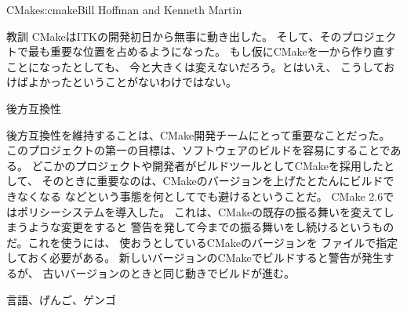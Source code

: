 \begin{aosachapter}{CMake}{s:cmake}{Bill Hoffman and Kenneth Martin}
\begin{aosasect1}{教訓}
CMakeはITKの開発初日から無事に動き出した。
そして、そのプロジェクトで最も重要な位置を占めるようになった。
もし仮にCMakeを一から作り直すことになったとしても、
今と大きくは変えないだろう。とはいえ、
こうしておけばよかったということがないわけではない。

\begin{aosasect2}{後方互換性}

後方互換性を維持することは、CMake開発チームにとって重要なことだった。
このプロジェクトの第一の目標は、ソフトウェアのビルドを容易にすることである。
どこかのプロジェクトや開発者がビルドツールとしてCMakeを採用したとして、
そのときに重要なのは、CMakeのバージョンを上げたとたんにビルドできなくなる
などという事態を何としてでも避けるということだ。
CMake 2.6ではポリシーシステムを導入した。
これは、CMakeの既存の振る舞いを変えてしまうような変更をすると
警告を発して今までの振る舞いをし続けるというものだ。これを使うには、
使おうとしているCMakeのバージョンを
ファイルで指定しておく必要がある。
新しいバージョンのCMakeでビルドすると警告が発生するが、
古いバージョンのときと同じ動きでビルドが進む。

\end{aosasect2}

\begin{aosasect2}{言語、げんご、ゲンゴ}


\end{aosasect2}
\end{aosasect1}
\end{aosachapter}

